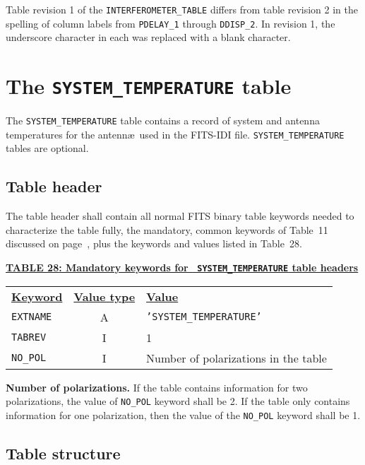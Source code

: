 \documentclass[twoside]{article}
\newcommand{\Hi}[1]{\textcolor{hicol}{#1}}
\begin{document}
\Hi{Table revision 1 of the {\tt INTERFEROMETER\_TABLE} differs from
table revision 2 in the spelling of column labels from {\tt PDELAY\_1}
through {\tt DDISP\_2}.  In revision 1, the underscore character in
each was replaced with a blank character.}

\section{The {\tt SYSTEM\_TEMPERATURE} table}
\label{s:TS}

The {\tt SYSTEM\_TEMPERATURE} table contains a record of system and
antenna temperatures for the antenn\ae\ used in the FITS-IDI file.
{\tt SYSTEM\_TEMPERATURE} tables are optional.

\subsection{Table header}

\Hi{The table header shall contain all normal FITS binary table
keywords needed to characterize the table fully, the mandatory, common
keywords of Table~11 discussed on page~\pageref{ta:keywords}, plus the
keywords and values listed in Table~\Hi{28}.}

\begin{center}
\underline{\bf{TABLE \Hi{28}: Mandatory keywords for {\tt
    SYSTEM\_TEMPERATURE} table headers}}\\
\begin{tabular}{lcl}
\noalign{\vspace{2pt}}
\underline{{\bf Keyword}} & \underline{\bf{Value type}} &
    \underline{\bf{Value\vphantom{y}}} \\
\noalign{\vspace{2pt}}
{\tt EXTNAME}   & A & {\tt 'SYSTEM\_TEMPERATURE'}  \\
{\tt TABREV}    & I & 1 \\
{\tt NO\_POL}   & I & Number of polarizations in the table
\end{tabular}
\end{center}

{\bf Number of polarizations.}  If the table contains information for
two polarizations, the value of {\tt NO\_POL} keyword shall be 2.  If
the table only contains information for one polarization, then the
value of the {\tt NO\_POL} keyword shall be 1.

\subsection{Table structure}
\end{document}
